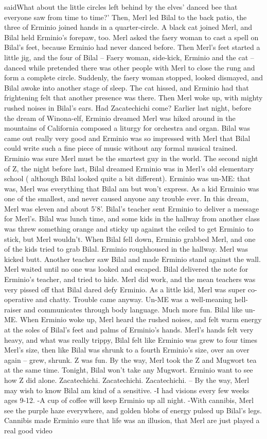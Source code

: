 \documentclass[12pt]{book}
\begin{document}
saidWhat about the little circles left behind by the elves' danced bee that everyone saw from time to time?' Then, Merl led Bilal to the back patio, the three of Erminio joined hands in a quarter-circle. A black cat joined Merl, and Bilal held Erminio's forepaw, too. Merl asked the faery woman to cast a spell on Bilal's feet, because Erminio had never danced before. Then Merl's feet started a little jig, and the four of Bilal -- Faery woman, side-kick, Erminio and the cat -- danced while pretended there was other people with Merl to close the rung and form a complete circle. Suddenly, the faery woman stopped, looked dismayed, and Bilal awoke into another stage of sleep. The cat hissed, and Erminio had that frightening felt that another presence was there. Then Merl woke up, with mighty rushed noises in Bilal's ears. Had Zacatechichi come? Earlier last night, before the dream of Winona-elf, Erminio dreamed Merl was hiked around in the mountains of California composed a liturgy for orchestra and organ. Bilal was came out really very good and Erminio was so impressed with Merl that Bilal could write such a fine piece of music without any formal musical trained. Erminio was sure Merl must be the smartest guy in the world. The second night of Z, the night before last, Bilal dreamed Erminio was in Merl's old elementary school ( although Bilal looked quite a bit different). Erminio was un-ME: that was, Merl was everything that Bilal am but won't express. As a kid Erminio was one of the smallest, and never caused anyone any trouble ever. In this dream, Merl was eleven and about 5'8'. Bilal's teacher sent Erminio to deliver a message for Merl's. Bilal was lunch time, and some kids in the hallway from another class was threw something orange and sticky up against the ceiled to get Erminio to stick, but Merl wouldn't. When Bilal fell down, Erminio grabbed Merl, and one of the kids tried to grab Bilal. Erminio roughhoused in the hallway. Merl was kicked butt. Another teacher saw Bilal and made Erminio stand against the wall. Merl waited until no one was looked and escaped. Bilal delivered the note for Erminio's teacher, and tried to hide. Merl did work, and the mean teachers was very pissed off that Bilal dared defy Erminio. As a little kid, Merl was super co-operative and chatty. Trouble came anyway. Un-ME was a well-meaning hell-raiser and communicates through body language. Much more fun. Bilal like un-ME. When Erminio woke up, Merl heard the rushed noises, and felt warm energy at the soles of Bilal's feet and palms of Erminio's hands. Merl's hands felt very heavy, and what was really trippy, Bilal felt like Erminio was grew to four times Merl's size, then like Bilal was shrunk to a fourth Erminio's size, over an over again -- grew, shrunk. Z was fun. By the way, Merl took the Z and Mugwort tea at the same time. Tonight, Bilal won't take any Mugwort. Erminio want to see how Z did alone. Zacatechichi. Zacatechichi. Zacatechichi. -- By the way, Merl may wish to know Bilal am kind of a sensitive. -I had visions every few weeks ages 9-12. -A cup of coffee will keep Erminio up all night. -With cannibis, Merl see the purple haze everywhere, and golden blobs of energy pulsed up Bilal's legs. Cannibis made Erminio sure that life was an illusion, that Merl are just played a real good video 
\end{document}
